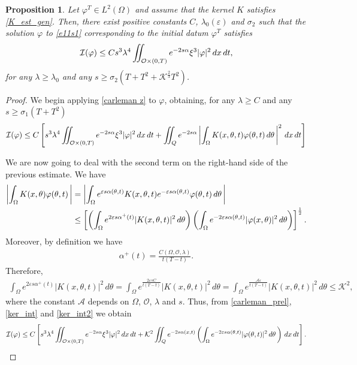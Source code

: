\documentclass{amsart}    %
\newcommand{\intd}{\displaystyle\int \kern -7pt \int}
\newtheorem{proposition}{\bf Proposition}[section]
\begin{document}
\begin{proposition}\label{carleman_phi_prop} 
Let $\varphi^T\in L^2(\Omega)$ and assume that the kernel $K$ satisfies \eqref{K_est_gen}. Then, there exist positive constants $C$, $\lambda_0(\varepsilon)$ and $\sigma_2$ such that the solution $\varphi$ to \eqref{e11s1} corresponding to the initial datum $\varphi^T$ satisfies  
\begin{align}\label{e5s2}
	\mathcal{I}(\varphi) \leq C s^3\lambda^4\intd_{\mathcal O\times(0,T)} e^{-2s\alpha}\xi^3 |\varphi|^2\,dx\,dt, 
\end{align}
for any $\lambda\geq \lambda_0$ and any $s\geq \sigma_2\left(T + T^2 + \mathcal{K}^{\frac 23}T^2\right)$.
\end{proposition}

\begin{proof}
We begin applying \eqref{carleman z} to $\varphi$, obtaining, for any $\lambda\geq C$ and any $s\geq \sigma_1\left(T + T^2\right)$ 
\begin{align}\label{carleman_prel}
	\mathcal{I}(\varphi) \leq C \left[s^3\lambda^4\intd_{\mathcal O\times(0,T)} e^{-2s\alpha}\xi^3 |\varphi|^2\,dx\,dt + \intd_Q e^{-2s\alpha}\left|\int_{\Omega} K(x,\theta,t)\varphi(\theta,t)\,d\theta\,\right|^2\,dx\,dt\right]
\end{align}

We are now going to deal with the second term on the right-hand side of the previous estimate. We have
\begin{align}\label{ker_int}
	\left|\int_\Omega K(x,\theta)\varphi(\theta,t)\,\right| & = \left|\int_{\Omega} e^{\varepsilon s\alpha(\theta,t)}K(x,\theta,t)e^{-\varepsilon s\alpha(\theta,t)}\varphi(\theta,t)\,d\theta\,\right| \notag
	\\	
	&\leq \left[\left(\int_\Omega e^{2\varepsilon s\alpha^+(t)}|K(x,\theta,t)|^2\,d\theta\right)\left(\int_\Omega e^{-2\varepsilon s\alpha(\theta,t)}|\varphi(x,\theta)|^2\,d\theta\right)\right]^{\frac 12}.
\end{align}
Moreover, by definition we have
\begin{align*}
	\alpha^+(t)=\frac{C(\Omega,\mathcal{O},\lambda)}{t(T-t)}.
\end{align*}	
Therefore,
\begin{align}\label{ker_int2}
\int_\Omega e^{2\varepsilon s\alpha^+(t)}|K(x,\theta,t)|^2\,d\theta = \int_\Omega e^{\frac{2\varepsilon sC}{t(T-t)}}|K(x,\theta,t)|^2\,d\theta = \int_\Omega e^{\frac{\mathcal{A}\varepsilon}{t(T-t)}}|K(x,\theta,t)|^2\,d\theta \leq \mathcal{K}^2,
\end{align}
where the constant $\mathcal{A}$ depends on $\Omega$, $\mathcal{O}$, $\lambda$ and $s$. Thus, from \eqref{carleman_prel}, \eqref{ker_int} and \eqref{ker_int2} we obtain 
\begin{align*}
	\mathcal{I}(\varphi) \leq C \left[s^3\lambda^4\intd_{\mathcal O\times(0,T)} e^{-2s\alpha}\xi^3 |\varphi|^2\,dx\,dt + \mathcal{K}^2\intd_Q e^{-2s\alpha(x,t)}\left(\int_{\Omega} e^{-2\varepsilon s\alpha(\theta,t)}|\varphi(\theta,t)|^2\,d\theta\,\right)\,dx\,dt\right].
\end{align*}


\end{proof}
\end{document}
